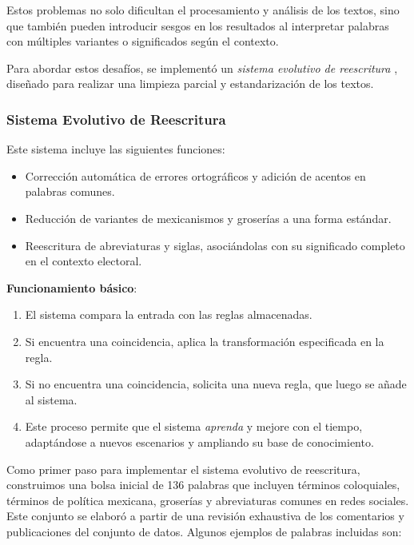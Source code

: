 \documentclass[10pt, a4paper]{article}
\begin{document}
	Estos problemas no solo dificultan el procesamiento y análisis de los textos, sino que también pueden introducir sesgos en los resultados al interpretar palabras con múltiples variantes o significados según el contexto.
	
	Para abordar estos desafíos, se implementó un \textit{sistema evolutivo de reescritura} \parencite{galindo1991sistemas}, diseñado para realizar una limpieza parcial y estandarización de los textos. 
	
	\subsubsection{Sistema Evolutivo de Reescritura}
	
	Este sistema incluye las siguientes funciones:
	\begin{itemize}
		\item Corrección automática de errores ortográficos y adición de acentos en palabras comunes.
		\item Reducción de variantes de mexicanismos y groserías a una forma estándar.
		\item Reescritura de abreviaturas y siglas, asociándolas con su significado completo en el contexto electoral.
	\end{itemize}
	
	\textbf{Funcionamiento básico}:
	\begin{enumerate}
		\item El sistema compara la entrada con las reglas almacenadas.
		\item Si encuentra una coincidencia, aplica la transformación especificada en la regla.
		\item Si no encuentra una coincidencia, solicita una nueva regla, que luego se añade al sistema.
		\item Este proceso permite que el sistema \textit{aprenda} y mejore con el tiempo, adaptándose a nuevos escenarios y ampliando su base de conocimiento.
	\end{enumerate}
	
	
	Como primer paso para implementar el sistema evolutivo de reescritura, construimos una bolsa inicial de 136 palabras que incluyen términos coloquiales, términos de política mexicana, groserías y abreviaturas comunes en redes sociales. Este conjunto se elaboró a partir de una revisión exhaustiva de los comentarios y publicaciones del conjunto de datos. Algunos ejemplos de palabras incluidas son:
	
\end{document}
